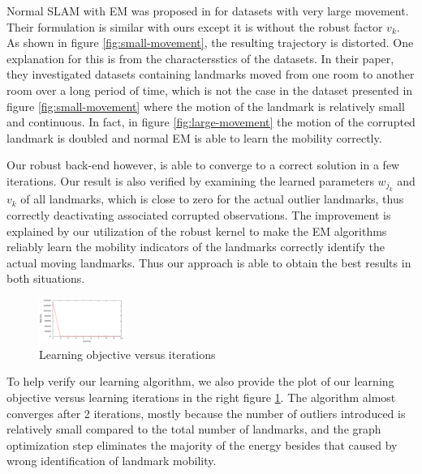 Normal SLAM with EM was proposed in \cite{rogers2010slam} for datasets with
very large movement. Their formulation is similar with ours except it is
without the robust factor $v_k$.  As shown in figure \ref{fig:small-movement},
the resulting trajectory is distorted. One explanation for this is from the
charactersstics of the datasets.  In their paper, they investigated datasets
containing landmarks moved from one room to another room over a long period of
time, which is not the case in the dataset presented in figure
\ref{fig:small-movement} where the motion of the landmark is relatively small
and continuous. In fact, in figure \ref{fig:large-movement} the motion of the
corrupted landmark is doubled and normal EM is able to learn the mobility
correctly.

Our robust back-end however, is able to converge to a correct solution in a few
iterations. Our result is also verified by examining the learned parameters
$w_{j_k}$ and $v_k$ of all landmarks, which is close to zero for the actual
outlier landmarks, thus correctly deactivating associated corrupted
observations.  The improvement is explained by our utilization of the robust
kernel to make the EM algorithms reliably learn the mobility indicators of the
landmarks correctly identify the actual moving landmarks. Thus our approach is
able to obtain the best results in both situations.

\begin{figure}
\begin{center}
 \includegraphics[width=0.25\textwidth]{fig/objective}
\end{center}
\caption{Learning objective versus iterations}
\label{fig:objective}
\end{figure}

To help verify our learning algorithm, we also provide the plot of our learning
objective versus learning iterations in the right figure \ref{fig:objective}.
The algorithm almost converges after 2 iterations, mostly because the number of
outliers introduced is relatively small compared to the total number of
landmarks, and the graph optimization step eliminates the majority of the
energy besides that caused by wrong identification of landmark mobility.
